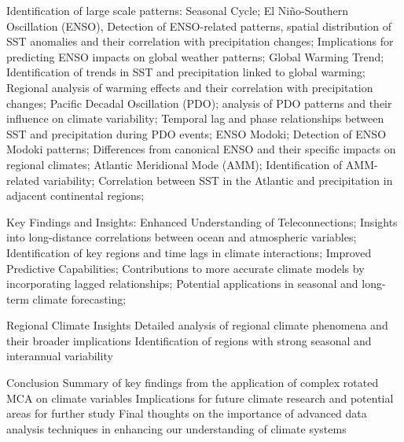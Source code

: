 Identification of large scale patterns: Seasonal Cycle; El Niño-Southern Oscillation (ENSO), Detection of ENSO-related patterns, spatial distribution of 
SST anomalies and their correlation with precipitation changes; Implications for predicting ENSO impacts on global weather patterns;
Global Warming Trend; Identification of trends in SST and precipitation linked to global warming; Regional analysis of warming effects and 
their correlation with precipitation changes; Pacific Decadal Oscillation (PDO); analysis of PDO patterns and their influence on climate variability;
Temporal lag and phase relationships between SST and precipitation during PDO events; ENSO Modoki; Detection of ENSO Modoki patterns; Differences from 
canonical ENSO and their specific impacts on regional climates; Atlantic Meridional Mode (AMM); Identification of AMM-related variability; Correlation between 
SST in the Atlantic and precipitation in adjacent continental regions; 

Key Findings and Insights:
Enhanced Understanding of Teleconnections; Insights into long-distance correlations between ocean and atmospheric variables; Identification of key regions and time lags 
in climate interactions; Improved Predictive Capabilities; Contributions to more accurate climate models by incorporating lagged relationships; Potential applications 
in seasonal and long-term climate forecasting; 

Regional Climate Insights
Detailed analysis of regional climate phenomena and their broader implications
Identification of regions with strong seasonal and interannual variability

Conclusion
Summary of key findings from the application of complex rotated MCA on climate variables
Implications for future climate research and potential areas for further study
Final thoughts on the importance of advanced data analysis techniques in enhancing our understanding of climate systems